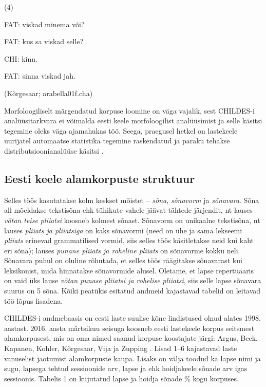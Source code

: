 \documentclass[12pt]{article}
\begin{document}
(4)
\begin{description}
    \item*FAT: viskad minema või?
    \item*FAT: kus sa viskad selle?
    \item*CHI: kinn.
    \item*FAT: sinna viskad jah.
    \item(Kõrgesaar; arabella01f.cha)
\end{description}
\hfill


Morfoloogiliselt märgendatud korpuse loomine on väga vajalik, sest CHILDES-i analüüsitarkvara ei võimalda eesti keele morfoloogilist analüüsimist ja selle käsitsi tegemine oleks väga ajamahukas töö. Seega, praegusel hetkel on lastekeele uurijatel automaatse statistika tegemine raskendatud ja paraku tehakse distributsioonianalüüse käsitsi \citep[78]{Argus2007}.

\subsection{Eesti keele alamkorpuste struktuur}

 Selles töös kasutatakse kolm keskset mõistet -- \emph{sõna}, \emph{sõnavorm} ja \emph{sõnavara}. Sõna all mõeldakse tekstisõna ehk tühikute vahele jäävat tähtede järjendit, nt lauses \emph{võtan teise pliiatsi} koosneb kolmest sõnast. Sõnavorm on unikaalne tekstisõna, nt lauses \emph{pliiats ja pliiatsiga} on kaks sõnavormi (need on ühe ja sama lekseemi \emph{pliiats} erinevad grammatilised vormid, siis selles töös käsitletakse neid kui kaht eri sõna); lauses \emph{punane pliiats ja roheline pliiats} on sõnavorme kokku neli. Sõnavara puhul on oluline rõhutada, et selles töös räägitakse sõnavarast kui leksikonist, mida hinnatakse sõnavormide alusel. Oletame, et lapse repertuaaris on vaid üks lause \emph{võtan punase pliiatsi ja rohelise pliiatsi}, siis selle lapse sõnavara suurus on 5 sõna. Kõiki peatükis esitatud andmeid kajastavad tabelid on leitavad töö lõpus lisadena.

CHILDES-i andmebaasis on eesti laste suulise kõne lindistused olnud alates 1998. aastast. 2016. aasta märtsikuu seisuga koosneb eesti lastekeele korpus seitsmest alamkorpusest, mis on oma nimed saanud korpuse koostajate järgi: Argus, Beek, Kapanen, Kohler, Kõrgesaar, Vija ja Zupping \citep{CHILDES}. Lisad 1--6 kajastavad laste vanuselist jaotumist alamkorpuste kaupa. Lisaks on välja toodud ka lapse nimi ja sugu, lapsega tehtud sessioonide arv, lapse ja ehk hoidjakeele sõnade arv igas sessioonis. Tabelis 1 on kujutatud lapse ja hoidja sõnade \% kogu korpuses.
\end{document}
